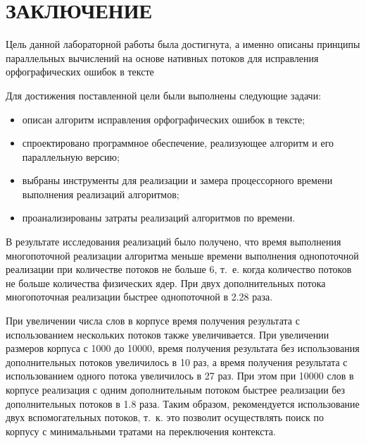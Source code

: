 \chapter*{ЗАКЛЮЧЕНИЕ}

Цель данной лабораторной работы была достигнута, а именно описаны принципы параллельных вычислений на основе нативных потоков для исправления орфографических ошибок в тексте

Для достижения поставленной цели были выполнены следующие задачи:
\begin{itemize}
	\item описан алгоритм исправления орфографических ошибок в тексте;
	\item спроектировано программное обеспечение, реализующее алгоритм и его параллельную версию;
	\item выбраны инструменты для реализации и замера процессорного времени
	выполнения реализаций алгоритмов;
	\item проанализированы затраты реализаций алгоритмов по времени.
\end{itemize}


В результате исследования реализаций было получено, что время выполнения многопоточной реализации алгоритма меньше времени выполнения однопоточной реализации при количестве потоков не больше 6, т.~е. когда количество потоков не больше количества физических ядер. При двух дополнительных потока многопоточная реализации быстрее однопоточной в 2.28 раза.

При увеличении числа слов в корпусе время получения результата с использованием нескольких потоков также увеличивается. 
При увеличении размеров корпуса с
1000 до 10000, время получения результата без использования дополнительных потоков
увеличилось в 10 раз, а время получения результата с использованием одного потока увеличилось в 27 раз. 
При этом при 10000 слов в корпусе реализация с одним дополнительным потоком быстрее реализации без дополнительных потоков в 1.8 раза. 
Таким образом, рекомендуется использование
двух вспомогательных потоков, т.~к. это позволит осуществлять поиск по корпусу с минимальными тратами на переключения контекста.
